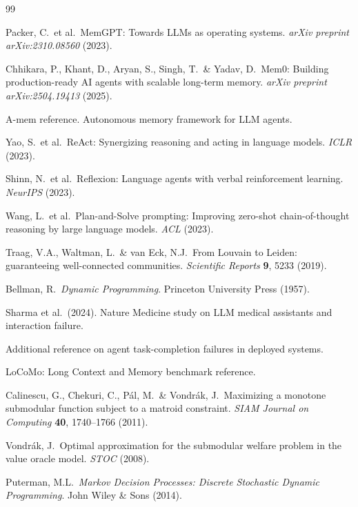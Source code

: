 \documentclass[11pt,a4paper]{article}
\newcommand{\placeholder}[1]{%
  \begin{tcolorbox}[colback=yellow!10,colframe=orange!60!black,
    fonttitle=\bfseries,title=Placeholder]
    #1
  \end{tcolorbox}%
}
\begin{document}
\begin{thebibliography}{99}

Packer, C.\ et al.\ MemGPT: Towards LLMs as operating systems.
\textit{arXiv preprint arXiv:2310.08560} (2023).

Chhikara, P., Khant, D., Aryan, S., Singh, T.\ \& Yadav, D.\
Mem0: Building production-ready AI agents with scalable long-term memory.
\textit{arXiv preprint arXiv:2504.19413} (2025).

\placeholder{A-mem reference. Autonomous memory framework for LLM agents.}

Yao, S.\ et al.\ ReAct: Synergizing reasoning and acting in language models.
\textit{ICLR} (2023).

Shinn, N.\ et al.\ Reflexion: Language agents with verbal reinforcement
learning. \textit{NeurIPS} (2023).

Wang, L.\ et al.\ Plan-and-Solve prompting: Improving zero-shot
chain-of-thought reasoning by large language models. \textit{ACL} (2023).

Traag, V.A., Waltman, L.\ \& van Eck, N.J.\ From Louvain to Leiden:
guaranteeing well-connected communities. \textit{Scientific Reports}
\textbf{9}, 5233 (2019).

Bellman, R.\ \textit{Dynamic Programming}. Princeton University Press (1957).

\placeholder{Sharma et al.\ (2024). Nature Medicine study on LLM medical
assistants and interaction failure.}

\placeholder{Additional reference on agent task-completion failures in
deployed systems.}

\placeholder{LoCoMo: Long Context and Memory benchmark reference.}

Calinescu, G., Chekuri, C., P\'{a}l, M.\ \& Vondr\'{a}k, J.\ Maximizing a
monotone submodular function subject to a matroid constraint. \textit{SIAM
Journal on Computing} \textbf{40}, 1740--1766 (2011).

Vondr\'{a}k, J.\ Optimal approximation for the submodular welfare problem in
the value oracle model. \textit{STOC} (2008).

Puterman, M.L.\ \textit{Markov Decision Processes: Discrete Stochastic
Dynamic Programming}. John Wiley \& Sons (2014).


\end{thebibliography}
\end{document}

